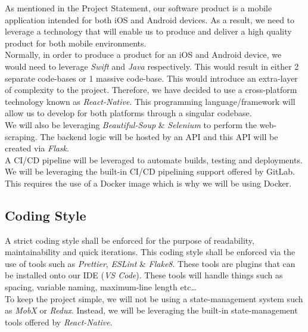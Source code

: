 \documentclass[11pt, oneside]{article}   	%
\begin{document}
As mentioned in the Project Statement, our software product is a mobile application intended for both iOS and Android devices. As a result, we need to leverage a technology that will enable us to produce and deliver a high quality product for both mobile environments. \\

Normally, in order to produce a product for an iOS and Android device, we would need to leverage {\it Swift} and {\it Java} respectively. This would result in either 2 separate code-bases or 1 massive code-base. This would introduce an extra-layer of complexity to the project. Therefore, we have decided to use a cross-platform technology known as {\it React-Native}. This programming language/framework will allow us to develop for both platforms through a singular codebase. \\

We will also be leveraging {\it Beautiful-Soup} \& {\it Selenium} to perform the web-scraping. The backend logic will be hosted by an API and this API will be created via {\it Flask}. \\

A CI/CD pipeline will be leveraged to automate builds, testing and deployments. We will be leveraging the built-in CI/CD pipelining support offered by GitLab. This requires the use of a Docker image which is why we will be using Docker. \\

\newpage
\subsection*{Coding Style}

A strict coding style shall be enforced for the purpose of readability, maintainability and quick iterations. This coding style shall be enforced via the use of tools such as {\it Prettier}, {\it ESLint} \& {\it Flake8}. These tools are plugins that can be installed onto our IDE ({\it VS Code}). These tools will handle things such as spacing, variable naming, maximum-line length etc…\\

To keep the project simple, we will not be using a state-management system such as {\it MobX} or {\it Redux}. Instead, we will be leveraging the built-in state-management tools offered by {\it React-Native}.
\end{document}
